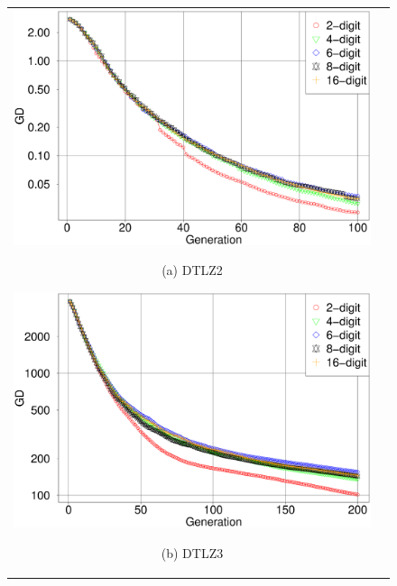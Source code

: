 \documentclass[../main/main]{subfiles}
\begin{document}
\begin{figure}[htbp]
\begin{tabular}{cc}
\begin{minipage}{0.32\hsize}
\includegraphics[width=1\linewidth]{../figures/MOEAD/DTLZ2_GD.eps}
\begin{center}
{\footnotesize (a) DTLZ2}
\end{center}
\end{minipage}
\begin{minipage}{0.32\hsize}
\includegraphics[width=1\linewidth]{../figures/MOEAD/DTLZ3_GD.eps}
\begin{center}
{\footnotesize (b) DTLZ3}
\end{center}
\end{minipage}
\begin{minipage}{0.32\hsize}

\end{minipage}
\end{tabular}
\end{figure}
\end{document}
